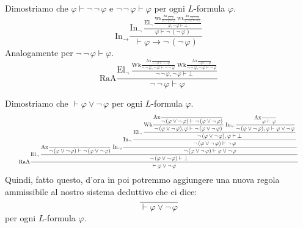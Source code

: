 \begin{example}
    Dimostriamo che $\varphi \vdash \neg \,\neg \,\varphi$ e $\neg \,\neg \,\varphi \vdash \varphi$ per ogni $L$-formula $\varphi$.
    \[\displaystyle\text{In}_\to\frac{\displaystyle\text{In}_\neg \,\frac{\displaystyle\text{El}_\neg \,\frac{\displaystyle \text{Wk}\frac{\displaystyle \text{Ax}\frac{}{\varphi \vdash \varphi}}{\varphi,\neg \,\varphi\vdash \varphi} \; \text{Wk}\frac{\displaystyle\text{Ax}\frac{}{\neg \, \varphi \vdash \neg \,\varphi}}{\varphi,\neg \,\varphi\vdash \neg \,\varphi}}{\varphi,\neg \,\varphi\vdash\bot}}{\varphi \vdash \neg \,(\neg \,\varphi)}}{\vdash \varphi \to \neg \,(\neg \, \varphi)}\]
    Analogamente per $\neg \,\neg \,\varphi \vdash \varphi$.
    \[\displaystyle\text{RaA}\frac{\displaystyle\text{El}_\neg \,\frac{\displaystyle\text{Wk}\frac{\displaystyle\text{Ax}\frac{}{\neg \,\neg \,\varphi \vdash \neg \,\neg \,\varphi}}{\neg \,\neg \,\varphi, \neg \,\varphi \vdash \neg \,\neg \,\varphi} \; \text{Wk}\frac{\displaystyle\text{Ax}\frac{}{\neg \,\varphi \vdash \neg \,\varphi}}{\neg \,\neg \,\varphi, \neg \,\varphi \vdash \neg \,\varphi}}{\neg \,\neg \,\varphi, \neg \,\varphi \vdash \bot}}{\neg \,\neg \,\varphi \vdash \varphi}\]
\end{example}

\enlargethispage{3\baselineskip}

\begin{example}
    Dimostriamo che $\vdash \varphi \lor \neg \,\varphi$ per ogni $L$-formula $\varphi$.
    \[\resizebox{0.95\linewidth}{!}{$\displaystyle\text{RaA}\frac{\displaystyle\text{El}_\neg \,\frac{\displaystyle\text{Ax}\frac{}{\neg \,(\varphi\lor\neg \,\varphi)\vdash\neg \,(\varphi\lor\neg \,\varphi)}\;\text{In}_{\cdot\lor}\frac{\displaystyle\text{In}_\neg \,\frac{\displaystyle\text{El}_\neg \,\frac{\displaystyle\text{Wk}\frac{\displaystyle\text{Ax}\frac{}{\neg \,(\varphi\lor\neg \,\varphi)\vdash\neg \,(\varphi\lor\neg \,\varphi)}}{\neg \,(\varphi\lor\neg \,\varphi),\varphi\vdash\neg \,(\varphi\lor\neg \,\varphi)}\;\text{In}_{\lor\cdot}\frac{\displaystyle\text{Ax}\frac{}{\varphi\vdash\varphi}}{\neg \,(\varphi\lor\neg \,\varphi),\varphi\vdash\varphi\lor\neg \,\varphi}}{\neg \,(\varphi\lor\neg \,\varphi),\varphi\vdash\bot}}{\neg \,(\varphi\lor\neg \,\varphi)\vdash\neg \,\varphi}}{\neg \,(\varphi\lor\neg \,\varphi)\vdash\varphi\lor\neg \,\varphi}}{\neg \,(\varphi\lor\neg \,\varphi)\vdash\bot}}{\vdash\varphi\lor\neg \,\varphi}$}\]
    Quindi, fatto questo, d'ora in poi potremmo aggiungere una nuova regola ammissibile al nostro sistema deduttivo che ci dice:
    \[\frac{}{\vdash \varphi \lor \neg \,\varphi}\]
    per ogni $L$-formula \(\varphi\).
\end{example}

